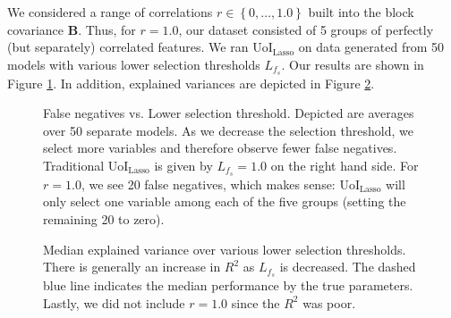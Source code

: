 \documentclass[11pt]{article}
\begin{document}
	We considered a range of correlations $r\in \left\{0, \ldots, 1.0\right\}$ built into the block covariance $\mathbf{B}$. Thus, for $r=1.0$, our dataset consisted of 5 groups of perfectly (but separately) correlated features. We ran UoI$_{\text{Lasso}}$ on data generated from 50 models with various lower selection thresholds $L_{f_s}$. Our results are shown in Figure \ref{fig:exp1_fn-vs-thres}. 	In addition, explained variances are depicted in Figure \ref{fig:exp1_r2-vs-thres}.
	\begin{figure}[ht]
		\centering
		\caption{False negatives vs. Lower selection threshold. Depicted are averages over 50 separate models. As we decrease the selection threshold, we select more variables and therefore observe fewer false negatives. Traditional UoI$_{\text{Lasso}}$ is given by $L_{f_s} = 1.0$ on the right hand side. For $r=1.0$, we see 20 false negatives, which makes sense: UoI$_{\text{Lasso}}$ will only select one variable among each of the five groups (setting the remaining 20 to zero).}
		\label{fig:exp1_fn-vs-thres}
	\end{figure}
	\begin{figure}[ht]
		\centering
		\caption{Median explained variance over various lower selection thresholds. There is generally an increase in $R^2$ as $L_{f_s}$ is decreased. The dashed blue line indicates the median performance by the true parameters. Lastly, we did not include $r=1.0$ since the $R^2$ was poor.}
		\label{fig:exp1_r2-vs-thres}
	\end{figure}
\end{document}
